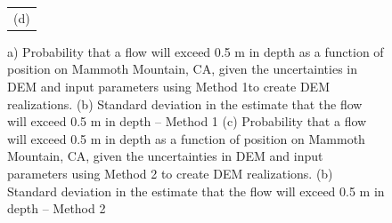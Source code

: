 \documentclass[12pt]{article}
\begin{document}
\begin{figure}[H]
\begin{minipage}{0.6\textwidth}
\begin{tabular}{c}
        (d)
        \end{tabular}
    \end{minipage} 
    \caption{a) Probability that a flow will exceed 0.5 m in depth as
      a function of position on Mammoth Mountain, CA, given the
      uncertainties in DEM and input parameters using Method 1to
      create DEM realizations. (b) Standard deviation in the estimate
      that the flow will exceed 0.5 m in depth -- Method 1 (c)
      Probability that a flow will exceed 0.5 m in depth as a function
      of position on Mammoth Mountain, CA, given the uncertainties in
      DEM and input parameters using Method 2 to create DEM
      realizations.  (b) Standard deviation in the estimate that the
      flow will exceed 0.5 m in depth -- Method 2 }
\label{fig4}  
\end{figure}
\end{document}
